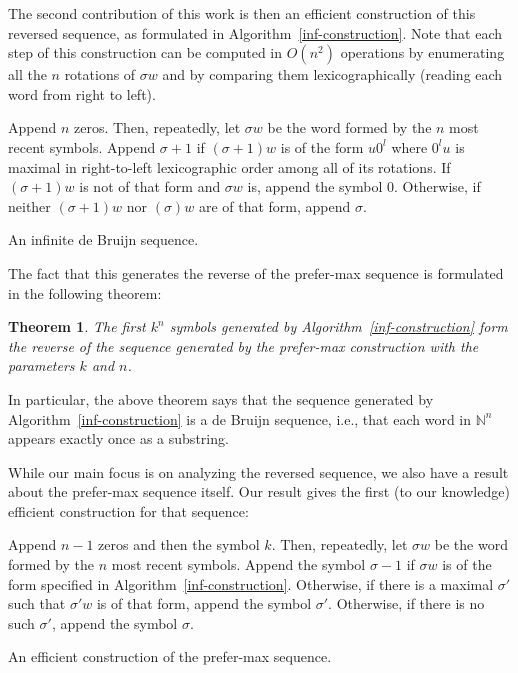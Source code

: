 \documentclass{article}
\newtheorem{theorem}{Theorem}
\theoremstyle{definition}
\newcommand{\N}{{\mathbb{N}}}
\begin{document}
The second contribution of this work is then an efficient construction of this reversed sequence, as formulated in Algorithm~\ref{inf-construction}. Note that each step of this construction can be computed in $O(n^2)$ operations by enumerating all the $n$ rotations of $\sigma w$ and by comparing them lexicographically (reading each word from right to left).


\begin{algorithm}[!h]
	Append $n$ zeros. Then, repeatedly, let $\sigma w$ be the word formed by the $n$ most recent symbols. Append $\sigma+1$ if $(\sigma+1)w$ is of the form $u0^l$ where $0^lu$ is maximal in right-to-left lexicographic order among all of its rotations. If $(\sigma+1)w$ is not of that form and $\sigma w$ is, append the symbol $0$. Otherwise, if neither $(\sigma+1)w$ nor $(\sigma)w$ are of that form, append $\sigma$.
	\caption{An infinite de Bruijn sequence.}
	\label{inf-construction}
\end{algorithm}

The fact that this generates the reverse of the prefer-max sequence is formulated in the following theorem:
 
\begin{theorem} 
The first $k^n$ symbols generated by Algorithm~\ref{inf-construction} form the reverse of the sequence generated by the prefer-max construction with the parameters $k$ and $n$.	
\end{theorem} 

In particular, the above theorem says that the sequence generated by Algorithm~\ref{inf-construction} is a de Bruijn sequence, i.e., that each word in $\N^n$ appears exactly once as a substring.

While our main focus is on analyzing the reversed sequence, we also have a result about the prefer-max sequence itself. Our result gives the first (to our knowledge) efficient construction for that sequence:

\begin{algorithm}[!h]
	Append $n-1$ zeros and then the symbol $k$. Then, repeatedly, let $\sigma w$ be the word formed by the $n$ most recent symbols. Append the symbol $\sigma-1$  if $\sigma w$  is of the form specified in Algorithm~\ref{inf-construction}. Otherwise, if there is a maximal $\sigma'$ such that $\sigma'w$ is of that form, append the symbol $\sigma'$. Otherwise, if there is no such $\sigma'$, append the symbol $\sigma$.
		
	\caption{An efficient construction of the prefer-max sequence.}
	\label{efficient-pref-max}
\end{algorithm}
\end{document}
